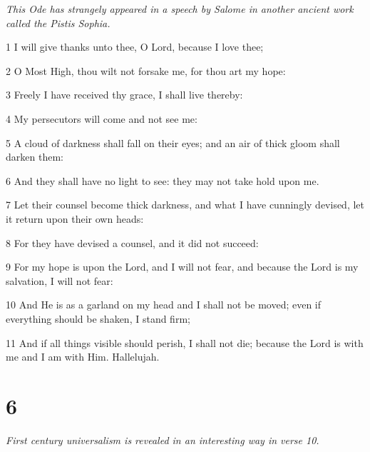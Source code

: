 \par \textit{This Ode has strangely appeared in a speech by Salome in another ancient work called the Pistis Sophia.}

\par 1 I will give thanks unto thee, O Lord, because I love thee;
\par 2 O Most High, thou wilt not forsake me, for thou art my hope:
\par 3 Freely I have received thy grace, I shall live thereby:
\par 4 My persecutors will come and not see me:
\par 5 A cloud of darkness shall fall on their eyes; and an air of thick gloom shall darken them:
\par 6 And they shall have no light to see: they may not take hold upon me.
\par 7 Let their counsel become thick darkness, and what I have cunningly devised, let it return upon their own heads:
\par 8 For they have devised a counsel, and it did not succeed:
\par 9 For my hope is upon the Lord, and I will not fear, and because the Lord is my salvation, I will not fear:
\par 10 And He is as a garland on my head and I shall not be moved; even if everything should be shaken, I stand firm;
\par 11 And if all things visible should perish, I shall not die; because the Lord is with me and I am with Him. Hallelujah.

\chapter{6}

\par \textit{First century universalism is revealed in an interesting way in verse 10.}

